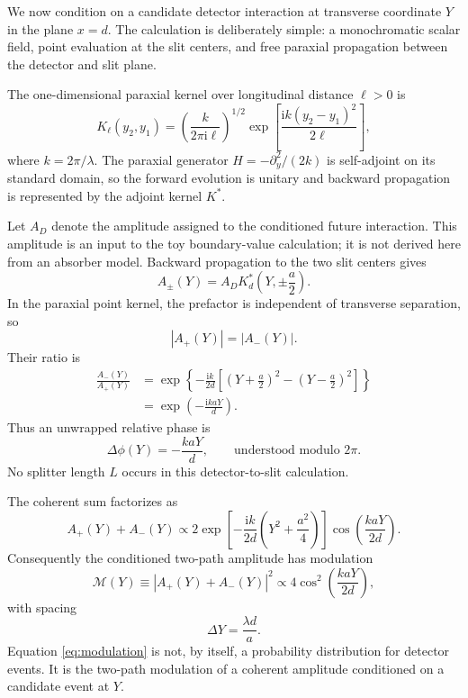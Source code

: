 \documentclass[11pt]{article}
\newcommand{\ii}{\mathrm{i}}
\begin{document}
We now condition on a candidate detector interaction at transverse coordinate $Y$ in the plane $x=d$.  The calculation is deliberately simple: a monochromatic scalar field, point evaluation at the slit centers, and free paraxial propagation between the detector and slit plane.

The one-dimensional paraxial kernel over longitudinal distance $\ell>0$ is
\begin{equation}
 K_\ell(y_2,y_1)
 =
 \left(\frac{k}{2\pi\ii\ell}\right)^{1/2}
 \exp\left[
 \frac{\ii k(y_2-y_1)^2}{2\ell}
 \right],
 \label{eq:kernel}
\end{equation}
where $k=2\pi/\lambda$.  The paraxial generator $H=-\partial_y^2/(2k)$ is self-adjoint on its standard domain, so the forward evolution is unitary and backward propagation is represented by the adjoint kernel $K^*$.

Let $A_D$ denote the amplitude assigned to the conditioned future interaction.  This amplitude is an input to the toy boundary-value calculation; it is not derived here from an absorber model.  Backward propagation to the two slit centers gives
\begin{equation}
 A_\pm(Y)
 =A_DK_d^*\left(Y,\pm\frac a2\right).
 \label{eq:slitamplitudes}
\end{equation}
In the paraxial point kernel, the prefactor is independent of transverse separation, so
\begin{equation}
 |A_+(Y)|=|A_-(Y)|.
 \label{eq:equalmagnitudes}
\end{equation}
Their ratio is
\begin{align}
 \frac{A_-(Y)}{A_+(Y)}
 &=\exp\left\{-\frac{\ii k}{2d}
 \left[
 \left(Y+\frac a2\right)^2
 -\left(Y-\frac a2\right)^2
 \right]\right\} \\
 &=\exp\left(-\frac{\ii kaY}{d}\right).
 \label{eq:relativephase}
\end{align}
Thus an unwrapped relative phase is
\begin{equation}
 \Delta\phi(Y)=-\frac{kaY}{d},
 \qquad\text{understood modulo }2\pi.
\end{equation}
No splitter length $L$ occurs in this detector-to-slit calculation.

The coherent sum factorizes as
\begin{equation}
 A_+(Y)+A_-(Y)
 \propto
 2\exp\left[-\frac{\ii k}{2d}
 \left(Y^2+\frac{a^2}{4}\right)\right]
 \cos\left(\frac{kaY}{2d}\right).
 \label{eq:conditionedsum}
\end{equation}
Consequently the conditioned two-path amplitude has modulation
\begin{equation}
 \mathcal M(Y)
 \equiv|A_+(Y)+A_-(Y)|^2
 \propto4\cos^2\left(\frac{kaY}{2d}\right),
 \label{eq:modulation}
\end{equation}
with spacing
\begin{equation}
 \Delta Y=\frac{\lambda d}{a}.
 \label{eq:spacing}
\end{equation}
Equation \eqref{eq:modulation} is not, by itself, a probability distribution for detector events.  It is the two-path modulation of a coherent amplitude conditioned on a candidate event at $Y$.
\end{document}
